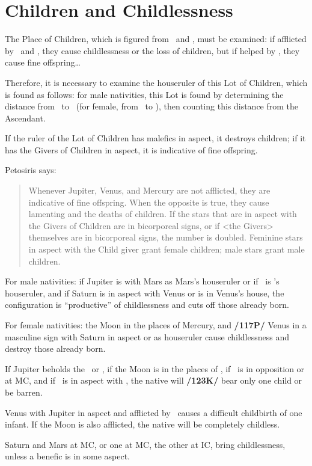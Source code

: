 \section{Children and Childlessness}
The Place of Children, which is figured from \Mercury\, and \Venus, must be examined: if afflicted by \Saturn\, and \Mars, they cause childlessness or the loss of children, but if helped by \Jupiter, they cause fine offspring\ldots

Therefore, it is necessary to examine the houseruler of this Lot of Children, which is found as follows: for male nativities, this Lot is found by determining the distance from \Jupiter\, to \Mercury\, (for female, from \Jupiter\, to \Venus), then counting this distance from the Ascendant. 

If the ruler of the Lot of Children has malefics in aspect, it destroys children; if it has the Givers of Children in aspect, it is indicative of fine offspring.

Petosiris says:\begin{quote}Whenever Jupiter, Venus, and Mercury are not afflicted, they are indicative of fine offspring. When the opposite is true, they cause lamenting and the deaths of children. If the stars that are in aspect with the Givers of Children are in bicorporeal signs, or if <the Givers> themselves are in bicorporeal signs, the number is doubled. Feminine stars in aspect with the Child giver grant female children; male stars grant male children.\end{quote}

For male nativities: if Jupiter is with Mars as Mars’s houseruler or if \Mars\, is \Jupiter’s houseruler, and if Saturn is in aspect with Venus or is in Venus's house, the configuration is “productive” of childlessness and cuts off those already born.

For female nativities: the Moon in the places of Mercury, and \textbf{/117P/} Venus in a masculine sign with Saturn in aspect or as houseruler cause childlessness and destroy those already born. 

If Jupiter beholds the \Moon\, or \Venus, if the Moon is in the places of \Mercury, if \Saturn\, is in opposition or at MC, and if \Mars\, is in aspect with \Saturn, the native will \textbf{/123K/} bear only one child or be barren. 

Venus with Jupiter in aspect and afflicted by \Saturn\, causes a difficult childbirth of one infant. If the Moon is also afflicted, the native will be completely childless. 

Saturn and Mars at MC, or one at MC, the other at IC, bring childlessness, unless a benefic is in some aspect.

\newpage
